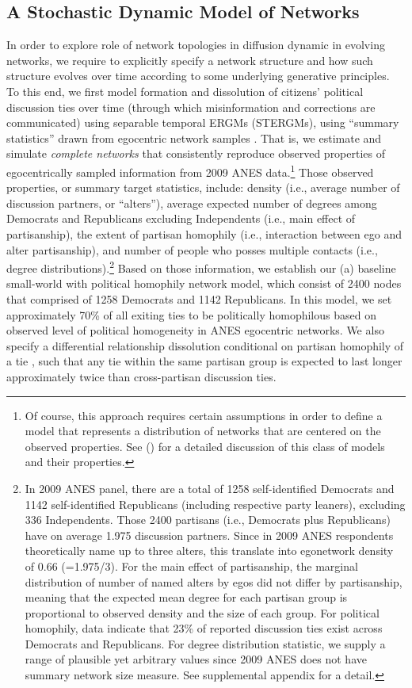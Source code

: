 \documentclass[man, 12pt, a4paper, noextraspace]{apa6}
\begin{document}
\subsection{A Stochastic Dynamic Model of Networks}

  In order to explore role of network topologies in diffusion dynamic in evolving networks, we require to explicitly specify a network structure and how such structure evolves over time according to some underlying generative principles. To this end, we first model formation and dissolution of citizens' political discussion ties over time (through which misinformation and corrections are communicated) using separable temporal ERGMs (STERGMs), using \enquote{summary statistics} drawn from egocentric network samples \parencite{krivitsky2017inference}. That is, we estimate and simulate \emph{complete networks} that consistently reproduce observed properties of egocentrically sampled information from 2009 ANES data.\footnote{ Of course, this approach requires certain assumptions in order to define a model that represents a distribution of networks that are centered on the observed properties. See \citeauthor{krivitsky2017inference} (\citeyear{krivitsky2017inference}) for a detailed discussion of this class of models and their properties.} Those observed properties, or summary target statistics, include: density (i.e., average number of discussion partners, or \enquote{alters}), average expected number of degrees among Democrats and Republicans excluding Independents (i.e., main effect of partisanship), the extent of partisan homophily (i.e., interaction between ego and alter partisanship), and number of people who posses multiple contacts (i.e., degree distributions).\footnote{  In 2009 ANES panel, there are a total of 1258 self-identified Democrats and 1142 self-identified Republicans (including respective party leaners), excluding 336 Independents. Those 2400 partisans (i.e., Democrats plus Republicans) have on average 1.975 discussion partners. Since in 2009 ANES respondents theoretically name up to three alters, this translate into egonetwork density of 0.66 (=1.975/3). For the main effect of partisanship, the marginal distribution of number of named alters by egos did not differ by partisanship, meaning that the expected mean degree for each partisan group is proportional to observed density and the size of each group. For political homophily, data indicate that 23\% of reported discussion ties exist across Democrats and Republicans. For degree distribution statistic, we supply a range of plausible yet arbitrary values since 2009 ANES does not have summary network size measure. See supplemental appendix for a detail.} Based on those information, we establish our (a) baseline small-world with political homophily network model, which consist of 2400 nodes that comprised of 1258 Democrats and 1142 Republicans. In this model, we set approximately 70\% of all exiting ties to be politically homophilous based on observed level of political homogeneity in ANES egocentric networks. We also specify a differential relationship dissolution conditional on partisan homophily of a tie \parencite[e.g., selective "unfriending":][]{noel2011unfriending}, such that any tie within the same partisan group is expected to last longer approximately twice than cross-partisan discussion ties. 
\end{document}
